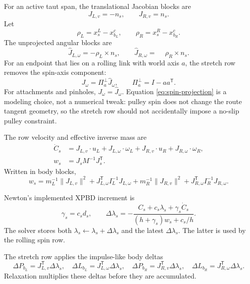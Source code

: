 \documentclass[11pt]{article}
\newcommand{\dd}{\Delta}
\newcommand{\T}{\mathsf{T}}
\newcommand{\proj}{\Pi}
\begin{document}
For an active taut span, the translational Jacobian blocks are
\begin{equation}
  J_{L,v}=-n_s,\qquad J_{R,v}=n_s.
\end{equation}
Let
\[
  \rho_L=x_s^L-x_{b_L}^c,\qquad \rho_R=x_s^R-x_{b_R}^c.
\]
The unprojected angular blocks are
\begin{equation}
  \widehat J_{L,\omega}= -\rho_L\times n_s,\qquad
  \widehat J_{R,\omega}= \phantom{-}\rho_R\times n_s.
  \label{eq:unprojected-angular}
\end{equation}
For an endpoint that lies on a rolling link with world axis $a$, the stretch
row removes the spin-axis component:
\begin{equation}
  J_{\omega} =
  \proj_a^\perp \widehat J_{\omega},\qquad
  \proj_a^\perp = I-aa^\T.
  \label{eq:spin-projection}
\end{equation}
For attachments and pinholes, $J_{\omega}=\widehat J_{\omega}$.  Equation
\eqref{eq:spin-projection} is a modeling choice, not a numerical tweak: pulley
spin does not change the route tangent geometry, so the stretch row should not
accidentally impose a no-slip pulley constraint.

The row velocity and effective inverse mass are
\begin{align}
  \dot C_s &=
  J_{L,v}\cdot u_L + J_{L,\omega}\cdot \omega_L
  + J_{R,v}\cdot u_R + J_{R,\omega}\cdot \omega_R,
  \\
  w_s &= J_s M^{-1}J_s^\T.
\end{align}
Written in body blocks,
\begin{equation}
  w_s =
  m_L^{-1}\|J_{L,v}\|^2
  + J_{L,\omega}^\T I_L^{-1}J_{L,\omega}
  + m_R^{-1}\|J_{R,v}\|^2
  + J_{R,\omega}^\T I_R^{-1}J_{R,\omega}.
\end{equation}

Newton's implemented XPBD increment is
\begin{equation}
  \gamma_s=c_s d_s,\qquad
  \dd\lambda_s =
  -\frac{
    C_s + c_s\lambda_s + \gamma_s\dot C_s
  }{
    (h+\gamma_s)w_s + c_s/h
  }.
  \label{eq:xpbd-stretch}
\end{equation}
The solver stores both $\lambda_s\leftarrow\lambda_s+\dd\lambda_s$ and the
latest $\dd\lambda_s$.  The latter is used by the rolling spin row.

The stretch row applies the impulse-like body deltas
\begin{equation}
  \dd P_{b_L}=J_{L,v}^\T\dd\lambda_s,\quad
  \dd L_{b_L}=J_{L,\omega}^\T\dd\lambda_s,\quad
  \dd P_{b_R}=J_{R,v}^\T\dd\lambda_s,\quad
  \dd L_{b_R}=J_{R,\omega}^\T\dd\lambda_s.
  \label{eq:stretch-deltas}
\end{equation}
Relaxation multiplies these deltas before they are accumulated.
\end{document}
